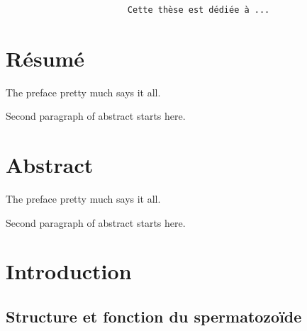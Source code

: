 \documentclass[12pt,twoside]{reedthesis}
\theoremstyle{definition}
\theoremstyle{definition}
\theoremstyle{remark}
\begin{document}
  ~
  
  ~
  
  ~
  
  ~
  
  ~
  
  ~
  
  ~
  
  ~
  
  ~
  
  ~
  
  ~
  
  ~
  
  ~
  
  ~
  
  ~
  
  ~
  
  ~
  
  ~
  
  ~
  
  ~
  
  ~
  
  ~
  
  \begin{verbatim}
                        Cette thèse est dédiée à ...
  \end{verbatim}
  
  \chapter*{Résumé}\label{resume}
  
  The preface pretty much says it all. \par
  
  Second paragraph of abstract starts here.
  
  \chapter*{Abstract}\label{abstract}
  
  The preface pretty much says it all. \par
  
  Second paragraph of abstract starts here.
  
  \chapter{Introduction}\label{introInf}
  
  \section{Structure et fonction du
  spermatozoïde}\label{structure-et-fonction-du-spermatozoide}
  
\end{document}
